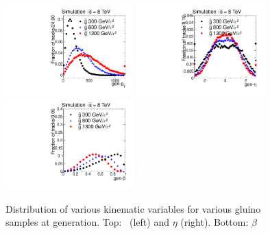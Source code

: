 \begin{figure}
 \begin{center}
  \includegraphics[clip=false, trim=0.0cm 0cm 1.4cm 0cm, width=0.44\textwidth]{figures/muonly/Selection_Comp_Gluino_genpT}
  \includegraphics[clip=false, trim=0.0cm 0cm 1.4cm 0cm, width=0.44\textwidth]{figures/muonly/Selection_Comp_Gluino_geneta}
  \includegraphics[clip=false, trim=0.0cm 0cm 1.4cm 0cm, width=0.44\textwidth]{figures/muonly/Selection_Comp_Gluino_genbeta}
 \end{center}
 \caption[Distribution of \pt, $\eta$, and $\beta$ for various gluino samples at generation]
{Distribution of various kinematic variables for various gluino samples at generation.
Top: \pt\ (left) and $\eta$ (right).
Bottom: $\beta$
   \label{fig:GenGluino}}
\end{figure}

